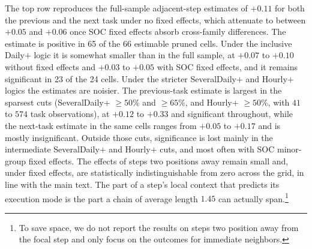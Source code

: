 The top row reproduces the full-sample adjacent-step estimates of $+0.11$ for both the previous and the next task under no fixed effects, which attenuate to between $+0.05$ and $+0.06$ once SOC fixed effects absorb cross-family differences.
The estimate is positive in 65 of the 66 estimable pruned cells.
Under the inclusive Daily$+$ logic it is somewhat smaller than in the full sample, at $+0.07$ to $+0.10$ without fixed effects and $+0.03$ to $+0.05$ with SOC fixed effects, and it remains significant in 23 of the 24 cells.
Under the stricter SeveralDaily$+$ and Hourly$+$ logics the estimates are noisier.
The previous-task estimate is largest in the sparsest cuts (SeveralDaily$+$ $\geq 50\%$ and $\geq 65\%$, and Hourly$+$ $\geq 50\%$, with $41$ to $574$ task observations), at $+0.12$ to $+0.33$ and significant throughout, while the next-task estimate in the same cells ranges from $+0.05$ to $+0.17$ and is mostly insignificant.
Outside those cuts, significance is lost mainly in the intermediate SeveralDaily$+$ and Hourly$+$ cuts, and most often with SOC minor-group fixed effects.
The effects of steps two positions away remain small and, under fixed effects, are statistically indistinguishable from zero across the grid, in line with the main text. The part of a step's local context that predicts its execution mode is the part a chain of average length $1.45$ can actually span.\footnote{ To save space, we do not report the results on steps two position away from the focal step and only focus on the outcomes for immediate neighbors.}

